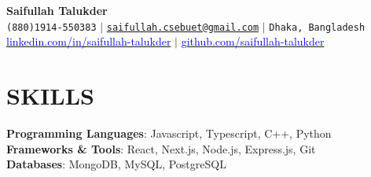 \documentclass[letterpaper,10pt]{article}
\begin{document}
\begin{center}
    \textbf{\Huge Saifullah Talukder} \\ \vspace{5pt}
    \small \faPhone* \texttt{(880)1914-550383} \hspace{1pt} $|$
    \hspace{1pt} \faEnvelope \hspace{2pt} \texttt{\href{mailto:saifullah.cse16.buet@gmail.com}{saifullah.csebuet@gmail.com}} \hspace{1pt} $|$ 
    \hspace{1pt} \faMapMarker* \hspace{2pt}\texttt{Dhaka, Bangladesh}
    \\ \vspace{5pt}
    \hspace{1pt} \faLinkedin \hspace{2pt} \href{https://www.linkedin.com/in/saifullah-talukder}{\textcolor{blue}{linkedin.com/in/saifullah-talukder}} \hspace{1pt} $|$
    \hspace{1pt} \faGithub \hspace{2pt} \href{https://github.com/saifullah-talukder}{\textcolor{blue}{github.com/saifullah-talukder}} \hspace{1pt} %
    \\ \vspace{-5pt}
\end{center}

\section{SKILLS}
 \begin{itemize}[leftmargin=0in, label={}]
    \small{\item{
     \textbf{Programming Languages}: \hspace{1pt} {Javascript, Typescript, C++, Python}\vspace{2pt} \\
     \textbf{Frameworks \& Tools}: \hspace{22pt} {React, Next.js, Node.js, Express.js, Git}\vspace{2pt} \\
     \textbf{Databases}: \hspace{65pt} {MongoDB, MySQL, PostgreSQL}
    }}
 \end{itemize}
\end{document}
